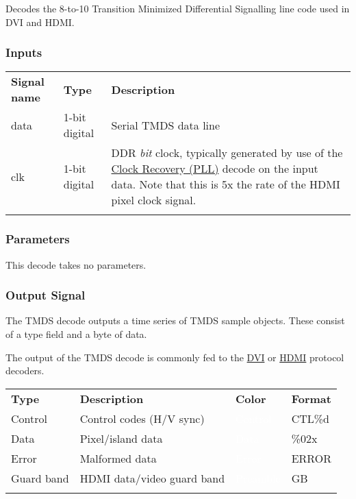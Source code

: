 Decodes the 8-to-10 Transition Minimized Differential Signalling line code used in DVI and HDMI.

\subsubsection{Inputs}

\begin{tabularx}{16cm}{llX}
\thickhline
\textbf{Signal name} & \textbf{Type} & \textbf{Description} \\
\thickhline
data & 1-bit digital & Serial TMDS data line \\
\thickhline
clk & 1-bit digital & DDR \emph{bit} clock, typically generated by use of the \hyperref[filter:cdrpll]{Clock Recovery
(PLL)} decode on the input data. Note that this is 5x the rate of the HDMI pixel clock signal. \\
\thickhline
\end{tabularx}

\subsubsection{Parameters}

This decode takes no parameters.

\subsubsection{Output Signal}

The TMDS decode outputs a time series of TMDS sample objects. These consist of a type field and a byte of data.

The output of the TMDS decode is commonly fed to the \hyperref[filter:dvi]{DVI} or \hyperref[filter:hdmi]{HDMI}
protocol decoders.

\begin{tabularx}{16cm}{lllX}
\thickhline
\textbf{Type} & \textbf{Description} & \textbf{Color} & \textbf{Format} \\
\thickhline
Control & Control codes (H/V sync) & \cellcolor{control}\textcolor{white}{Control} & CTL\%d \\
\thickhline
Data & Pixel/island data & \cellcolor{data}\textcolor{white}{Data} & \%02x \\
\thickhline
Error & Malformed data & \cellcolor{error}\textcolor{white}{Error} & ERROR \\
\thickhline
Guard band & HDMI data/video guard band & \cellcolor{preamble}\textcolor{white}{Preamble} & GB \\
\thickhline
\end{tabularx}


